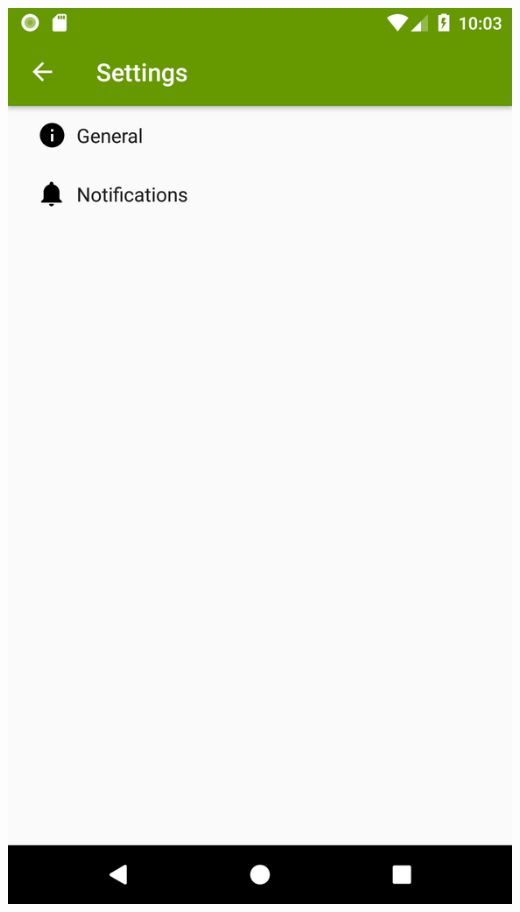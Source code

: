 \documentclass[a4paper,12pt]{article}
\begin{document}
\begin{spacing}{1}
	\includegraphics*[scale=0.1]{Screenshot/09.png}    

\end{spacing}
\end{document}
